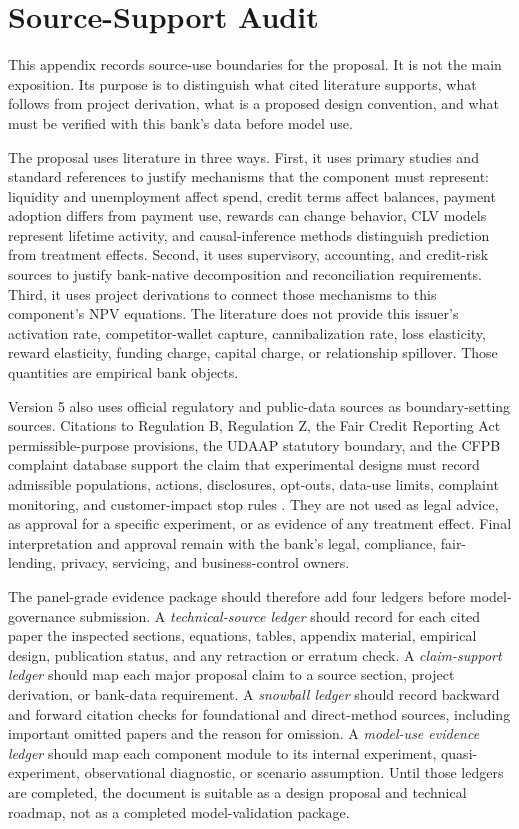 \documentclass[11pt]{article}
\newcommand{\1}{\mathbf{1}}
\begin{document}
\section{Source-Support Audit}
\label{sec:audit}

This appendix records source-use boundaries for the proposal. It is not the
main exposition. Its purpose is to distinguish what cited literature supports,
what follows from project derivation, what is a proposed design convention, and
what must be verified with this bank's data before model use.

The proposal uses literature in three ways. First, it uses primary studies and
standard references to justify mechanisms that the component must represent:
liquidity and unemployment affect spend, credit terms affect balances, payment
adoption differs from payment use, rewards can change behavior, CLV models
represent lifetime activity, and causal-inference methods distinguish
prediction from treatment effects. Second, it uses supervisory, accounting,
and credit-risk sources to justify bank-native decomposition and reconciliation
requirements. Third, it uses project derivations to connect those mechanisms
to this component's NPV equations. The literature does not provide this
issuer's activation rate, competitor-wallet capture, cannibalization rate,
loss elasticity, reward elasticity, funding charge, capital charge, or
relationship spillover. Those quantities are empirical bank objects.

Version 5 also uses official regulatory and public-data sources as
boundary-setting sources. Citations to Regulation B, Regulation Z, the Fair
Credit Reporting Act permissible-purpose provisions, the UDAAP statutory
boundary, and the CFPB complaint database support the claim that experimental
designs must record admissible populations, actions, disclosures, opt-outs,
data-use limits, complaint monitoring, and customer-impact stop rules
\citep{cfpbRegB1002,cfpbRegZ1026,uscodeFCRA1681b,uscodeUDAAP5531,
cfpbConsumerComplaints}. They are not used as legal advice, as approval for a
specific experiment, or as evidence of any treatment effect. Final
interpretation and approval remain with the bank's legal, compliance,
fair-lending, privacy, servicing, and business-control owners.

The panel-grade evidence package should therefore add four ledgers before
model-governance submission. A \emph{technical-source ledger} should record
for each cited paper the inspected sections, equations, tables, appendix
material, empirical design, publication status, and any retraction or erratum
check. A \emph{claim-support ledger} should map each major proposal claim to a
source section, project derivation, or bank-data requirement. A
\emph{snowball ledger} should record backward and forward citation checks for
foundational and direct-method sources, including important omitted papers and
the reason for omission. A \emph{model-use evidence ledger} should map each
component module to its internal experiment, quasi-experiment, observational
diagnostic, or scenario assumption. Until those ledgers are completed, the
document is suitable as a design proposal and technical roadmap, not as a
completed model-validation package.
\end{document}

